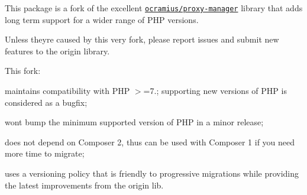 This package is a fork of the excellent \href{https://github.com/Ocramius/ProxyManager/}{\texttt{ {\ttfamily ocramius/proxy-\/manager}}} library that adds long term support for a wider range of PHP versions.

Unless they\textquotesingle{}re caused by this very fork, please report issues and submit new features to the origin library.

This fork\+:
\begin{DoxyItemize}
\item maintains compatibility with PHP {\ttfamily \texorpdfstring{$>$}{>}=7.}; supporting new versions of PHP is considered as a bugfix;
\item won\textquotesingle{}t bump the minimum supported version of PHP in a minor release;
\item does not depend on Composer 2, thus can be used with Composer 1 if you need more time to migrate;
\item uses a versioning policy that is friendly to progressive migrations while providing the latest improvements from the origin lib. 
\end{DoxyItemize}